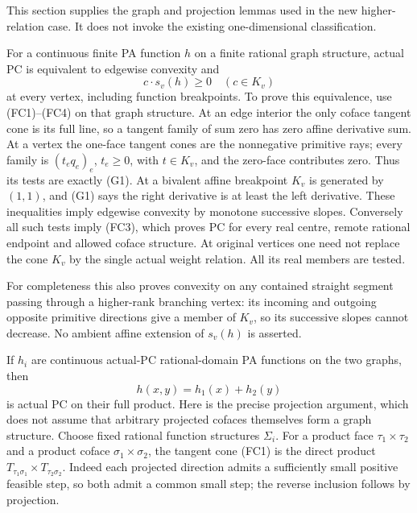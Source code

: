 \documentclass[
  11pt,
]{article}
\begin{document}
This section supplies the graph and projection lemmas used in the new
higher-relation case. It does not invoke the existing one-dimensional
classification.

For a continuous finite PA function \(h\) on a finite rational graph
structure, actual PC is equivalent to edgewise convexity and \[
             c\mathbin{\cdot}s_v(h)\geq0\quad(c\in K_v)       \tag{G1}
\] at every vertex, including function breakpoints. To prove this
equivalence, use (FC1)--(FC4) on that graph structure. At an edge
interior the only coface tangent cone is its full line, so a tangent
family of sum zero has zero affine derivative sum. At a vertex the
one-face tangent cones are the nonnegative primitive rays; every family
is \((t_eq_e)_e\), \(t_e\geq0\), with \(t\in K_v\), and the zero-face
contributes zero. Thus its tests are exactly (G1). At a bivalent affine
breakpoint \(K_v\) is generated by \((1,1)\), and (G1) says the right
derivative is at least the left derivative. These inequalities imply
edgewise convexity by monotone successive slopes. Conversely all such
tests imply (FC3), which proves PC for every real centre, remote
rational endpoint and allowed coface structure. At original vertices one
need not replace the cone \(K_v\) by the single actual weight relation.
All its real members are tested.

For completeness this also proves convexity on any contained straight
segment passing through a higher-rank branching vertex: its incoming and
outgoing opposite primitive directions give a member of \(K_v\), so its
successive slopes cannot decrease. No ambient affine extension of
\(s_v(h)\) is asserted.

If \(h_i\) are continuous actual-PC rational-domain PA functions on the
two graphs, then \[
                  h(x,y)=h_1(x)+h_2(y)                       \tag{G2}
\] is actual PC on their full product. Here is the precise projection
argument, which does not assume that arbitrary projected cofaces
themselves form a graph structure. Choose fixed rational function
structures \(\Sigma_i\). For a product face \(\tau_1\times\tau_2\) and a
product coface \(\sigma_1\times\sigma_2\), the tangent cone (FC1) is the
direct product \(T_{\tau_1\sigma_1}\times T_{\tau_2\sigma_2}\). Indeed
each projected direction admits a sufficiently small positive feasible
step, so both admit a common small step; the reverse inclusion follows
by projection.
\end{document}
